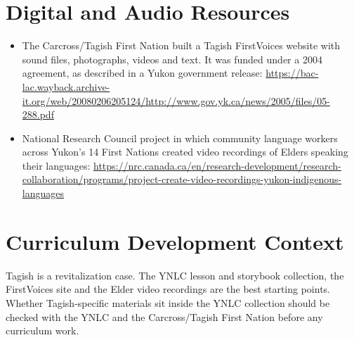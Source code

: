 \documentclass[12pt]{article}
\begin{document}
\section{Digital and Audio Resources}
\begin{itemize}
\item The Carcross/Tagish First Nation built a Tagish FirstVoices website with sound files, photographs, videos and text. It was funded under a 2004 agreement, as described in a Yukon government release: \url{https://bac-lac.wayback.archive-it.org/web/20080206205124/http://www.gov.yk.ca/news/2005/files/05-288.pdf}
\item National Research Council project in which community language workers across Yukon's 14 First Nations created video recordings of Elders speaking their languages: \url{https://nrc.canada.ca/en/research-development/research-collaboration/programs/project-create-video-recordings-yukon-indigenous-languages}
\end{itemize}

\section{Curriculum Development Context}
Tagish is a revitalization case. The YNLC lesson and storybook collection, the FirstVoices site and the Elder video recordings are the best starting points. Whether Tagish-specific materials sit inside the YNLC collection should be checked with the YNLC and the Carcross/Tagish First Nation before any curriculum work.
\end{document}
